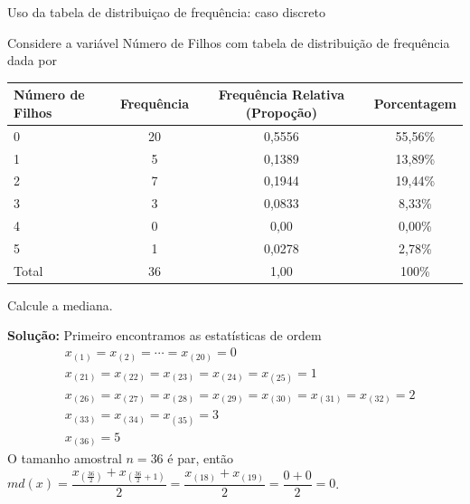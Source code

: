 \documentclass[8pt]{beamer}
\begin{document}
\begin{frame}{Uso da tabela de distribuiçao de frequência: caso discreto}

 {\scriptsize
Considere a variável Número de Filhos com tabela de distribuição de frequência dada por


 \begin{table}
  \centering
  \begin{tabular}{l|ccc}
    \toprule[0.05cm]
    Número de Filhos & Frequência & Frequência Relativa (Propoção) & Porcentagem\\
    \midrule[0.05cm]
    0 & 20 & 0,5556 & 55,56\% \\
    1 & 5 & 0,1389 & 13,89\% \\
    2 & 7 & 0,1944 & 19,44\% \\
    3 & 3 & 0,0833 & 8,33\% \\
    4 & 0 & 0,00 & 0,00\% \\
    5 & 1 & 0,0278 & 2,78\% \\ \midrule[0,05cm]
    Total & 36 & 1,00 & 100\% \\ \bottomrule[0,05cm]
  \end{tabular}
 \end{table}

 
 Calcule a mediana.
 
 
 \textbf{Solução:} Primeiro encontramos as estatísticas de ordem
 \begin{align*}
  &x_{(1)}=x_{(2)}=\cdots=x_{(20)} = 0\\
  &x_{(21)} = x_{(22)} = x_{(23)} = x_{(24)} = x_{(25)}=1\\
  &x_{(26)} = x_{(27)} =  x_{(28)} = x_{(29)} = x_{(30)} = x_{(31)} = x_{(32)} = 2\\
  &x_{(33)} = x_{(34)} = x_{(35)} = 3\\
  &x_{(36)} = 5
 \end{align*}
 O tamanho amostral $n=36$ é par, então $md(x) = \dfrac{ x_{\left( \frac{36}{2} \right)}+x_{\left( \frac{36}{2} +1\right)}}{2} = \dfrac{ x_{(18)}+x_{(19)}}{2} = \dfrac{0+0}{2}=0$.
}
\end{frame}
\end{document}
